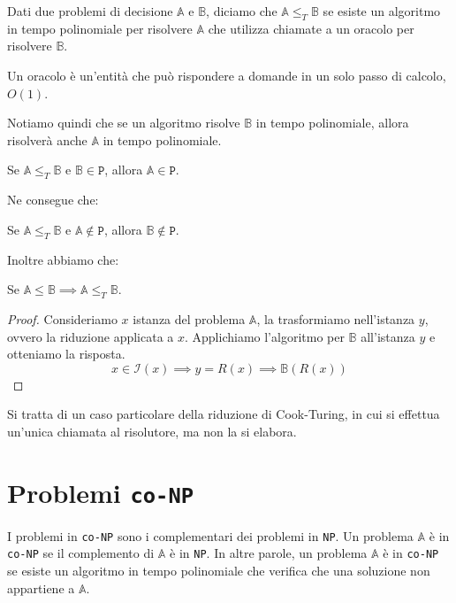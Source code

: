 \begin{tcolorbox}[title =$\mathbb{A} \leq_T \mathbb{B}$]
    Dati due problemi di decisione $\mathbb{A}$ e $\mathbb{B}$, diciamo che $\mathbb{A} \leq_T \mathbb{B}$
    se esiste un algoritmo in tempo polinomiale per risolvere $\mathbb{A}$ che utilizza chiamate a un
    oracolo per risolvere $\mathbb{B}$.
\end{tcolorbox}
\begin{tcolorbox}[title = Oracolo]
    Un oracolo è un'entità che può rispondere a domande in un solo passo di calcolo, $O(1)$.
\end{tcolorbox}
Notiamo quindi che se un algoritmo risolve $\mathbb{B}$ in tempo polinomiale, allora risolverà
anche $\mathbb{A}$ in tempo polinomiale. 
\begin{theorem}
    Se $\mathbb{A} \leq_T \mathbb{B}$ e $\mathbb{B} \in \texttt{P}$, allora $\mathbb{A} \in \texttt{P}$.
\end{theorem}
Ne consegue che:
\begin{theorem}
    Se $\mathbb{A} \leq_T \mathbb{B}$ e $\mathbb{A} \not \in \texttt{P}$, allora $\mathbb{B} \not \in \texttt{P}$.
\end{theorem}

Inoltre abbiamo che:
\begin{theorem}
    Se $\mathbb{A} \leq \mathbb{B} \implies \mathbb{A} \leq_T \mathbb{B}$.
\end{theorem}
\begin{proof}
    Consideriamo $x$ istanza del problema $\mathbb{A}$, la trasformiamo nell'istanza $y$, ovvero la riduzione applicata 
    a $x$. Applichiamo l'algoritmo per $\mathbb{B}$ all'istanza $y$ e otteniamo la risposta.
    \[
        x \in \mathcal{I}(x) \implies y = R(x) \implies \mathbb{B}(R(x))
    \]
\end{proof}
Si tratta di un caso particolare della riduzione di Cook-Turing, in cui si effettua un'unica chiamata al risolutore,
ma non la si elabora.

\section{Problemi \texttt{co-NP}}
I problemi in \texttt{co-NP} sono i complementari dei problemi in \texttt{NP}. Un problema
$\mathbb{A}$ è in \texttt{co-NP} se il complemento di $\mathbb{A}$ è in \texttt{NP}. In altre
parole, un problema $\mathbb{A}$ è in \texttt{co-NP} se esiste un algoritmo in tempo polinomiale
che verifica che una soluzione non appartiene a $\mathbb{A}$.

